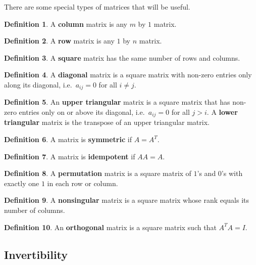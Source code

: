 \documentclass[12pt,reqno]{amsart}
\theoremstyle{definition}
\newtheorem{definition}{Definition}[section]
\begin{document}
There are some special types of matrices that will be useful.
\begin{definition}
  A \textbf{column} matrix is any $m$ by $1$ matrix.
\end{definition}

\begin{definition}
  A \textbf{row} matrix is any $1$ by $n$ matrix.
\end{definition}

\begin{definition}
  A \textbf{square} matrix has the same number of rows and columns.
\end{definition}

\begin{definition}
  A \textbf{diagonal} matrix is a square matrix with non-zero entries
  only along its diagonal, i.e.\ $a_{ij} = 0$ for all $i \neq j$. 
\end{definition}

\begin{definition}
  An \textbf{upper triangular} matrix is a square matrix that has
  non-zero entries only on or above its diagonal, i.e.\ $a_{ij} = 0$
  for all $j>i$. A \textbf{lower triangular} matrix is the transpose
  of an upper triangular matrix.
\end{definition}

\begin{definition}
  A matrix is \textbf{symmetric} if $A = A^T$.
\end{definition}

\begin{definition}
  A matrix is \textbf{idempotent} if $AA = A$.
\end{definition}

\begin{definition}
  A \textbf{permutation} matrix is a square matrix of $1$'s and $0$'s
  with exactly one $1$ in each row or column.  
\end{definition}

\begin{definition}
  A \textbf{nonsingular} matrix is a square matrix whose rank equals
  its number of columns.
\end{definition}

\begin{definition}
  An \textbf{orthogonal} matrix is a square matrix such that $A^TA =
  I$.
\end{definition}

\subsection{Invertibility}
\end{document}
